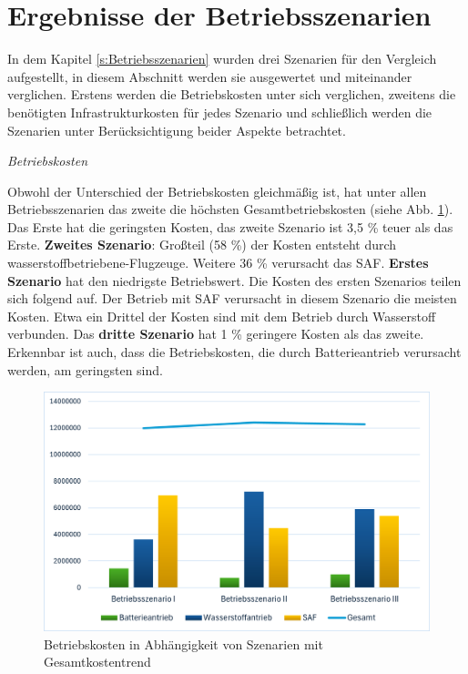 \section{Ergebnisse der Betriebsszenarien}
In dem Kapitel \ref{s:Betriebsszenarien} wurden drei Szenarien für den Vergleich aufgestellt, 
in diesem Abschnitt werden sie ausgewertet und miteinander verglichen. 
Erstens werden die Betriebskosten unter sich verglichen, 
zweitens die benötigten Infrastrukturkosten für jedes Szenario und schließlich 
werden die Szenarien unter Berücksichtigung beider Aspekte betrachtet.

\textit{Betriebskosten}

Obwohl der Unterschied der Betriebskosten gleichmäßig ist, 
hat unter allen Betriebsszenarien das zweite die höchsten Gesamtbetriebskosten (siehe Abb. \ref{res_betriebsszenarien}). 
Das Erste hat die geringsten Kosten, das zweite Szenario ist 3,5 \% teuer als das Erste.
\textbf{Zweites Szenario}: Großteil (58 \%) der Kosten entsteht durch wasserstoffbetriebene-Flugzeuge. Weitere 36 \% verursacht das SAF.
\textbf{Erstes Szenario} hat den niedrigste Betriebswert. 
Die Kosten des ersten Szenarios teilen sich folgend auf. 
Der Betrieb mit SAF verursacht in diesem Szenario die meisten Kosten. 
Etwa ein Drittel der Kosten sind mit dem Betrieb durch Wasserstoff verbunden.
Das \textbf{dritte Szenario} hat 1 \% geringere Kosten als das zweite.
Erkennbar ist auch, dass die Betriebskosten, die durch Batterieantrieb verursacht werden, 
am geringsten sind.
\begin{figure}[h]
	\centering
	\includegraphics[width=0.8\linewidth]{Bilder/betriebssz_res.png}
	\caption[Betriebskosten in Abhängigkeit von Szenarien mit Gesamtkostentrend]{Betriebskosten in Abhängigkeit von Szenarien mit Gesamtkostentrend}
	\label{res_betriebsszenarien}
\end{figure}

